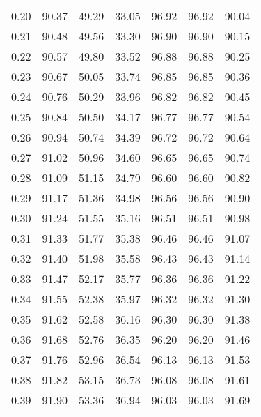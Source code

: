 \begin{tabular}{|c|c|c|c|c|c|c|}
      0.20 &     90.37 &     49.29 &      33.05 &   96.92 &      96.92 &         90.04 \\
      0.21 &     90.48 &     49.56 &      33.30 &   96.90 &      96.90 &         90.15 \\
      0.22 &     90.57 &     49.80 &      33.52 &   96.88 &      96.88 &         90.25 \\
      0.23 &     90.67 &     50.05 &      33.74 &   96.85 &      96.85 &         90.36 \\
      0.24 &     90.76 &     50.29 &      33.96 &   96.82 &      96.82 &         90.45 \\
      0.25 &     90.84 &     50.50 &      34.17 &   96.77 &      96.77 &         90.54 \\
      0.26 &     90.94 &     50.74 &      34.39 &   96.72 &      96.72 &         90.64 \\
      0.27 &     91.02 &     50.96 &      34.60 &   96.65 &      96.65 &         90.74 \\
      0.28 &     91.09 &     51.15 &      34.79 &   96.60 &      96.60 &         90.82 \\
      0.29 &     91.17 &     51.36 &      34.98 &   96.56 &      96.56 &         90.90 \\
      0.30 &     91.24 &     51.55 &      35.16 &   96.51 &      96.51 &         90.98 \\
      0.31 &     91.33 &     51.77 &      35.38 &   96.46 &      96.46 &         91.07 \\
      0.32 &     91.40 &     51.98 &      35.58 &   96.43 &      96.43 &         91.14 \\
      0.33 &     91.47 &     52.17 &      35.77 &   96.36 &      96.36 &         91.22 \\
      0.34 &     91.55 &     52.38 &      35.97 &   96.32 &      96.32 &         91.30 \\
      0.35 &     91.62 &     52.58 &      36.16 &   96.30 &      96.30 &         91.38 \\
      0.36 &     91.68 &     52.76 &      36.35 &   96.20 &      96.20 &         91.46 \\
      0.37 &     91.76 &     52.96 &      36.54 &   96.13 &      96.13 &         91.53 \\
      0.38 &     91.82 &     53.15 &      36.73 &   96.08 &      96.08 &         91.61 \\
      0.39 &     91.90 &     53.36 &      36.94 &   96.03 &      96.03 &         91.69 \\

\end{tabular}

